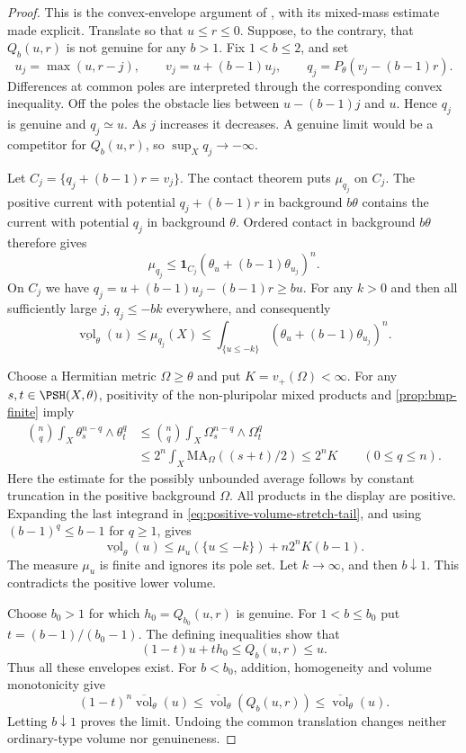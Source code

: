 \begin{proof}
This is the convex-envelope argument of \cite[Proposition 3.1]{XL26}, with its mixed-mass estimate made explicit. Translate so that $u\leq r\leq0$. Suppose, to the contrary, that $Q_b(u,r)$ is not genuine for any $b>1$. Fix $1<b\leq2$, and set
\[
 u_j=\max(u,r-j),\qquad v_j=u+(b-1)u_j,
 \qquad q_j=P_\theta(v_j-(b-1)r).
\]
Differences at common poles are interpreted through the corresponding convex inequality. Off the poles the obstacle lies between $u-(b-1)j$ and $u$. Hence $q_j$ is genuine and $q_j\simeq u$. As $j$ increases it decreases. A genuine limit would be a competitor for $Q_b(u,r)$, so $\sup_Xq_j\to-\infty$.

Let $C_j=\{q_j+(b-1)r=v_j\}$. The contact theorem puts $\mu_{q_j}$ on $C_j$. The positive current with potential $q_j+(b-1)r$ in background $b\theta$ contains the current with potential $q_j$ in background $\theta$. Ordered contact in background $b\theta$ therefore gives
\[
 \mu_{q_j}\leq\mathbf1_{C_j}(\theta_u+(b-1)\theta_{u_j})^n.
\]
On $C_j$ we have $q_j=u+(b-1)u_j-(b-1)r\geq bu$. For any $k>0$ and then all sufficiently large $j$, $q_j\leq-bk$ everywhere, and consequently
\begin{equation}\label{eq:positive-volume-stretch-tail}
 \underline{\operatorname{vol}}_\theta(u)
 \leq\mu_{q_j}(X)
 \leq\int_{\{u\leq-k\}}(\theta_u+(b-1)\theta_{u_j})^n.
\end{equation}

Choose a Hermitian metric $\Omega\geq\theta$ and put $K=v_+(\Omega)<\infty$. For any $s,t\in\PSH(X,\theta)$, positivity of the non-pluripolar mixed products and \cref{prop:bmp-finite} imply
\[
 \begin{split}
 \binom nq\int_X\theta_s^{n-q}\wedge\theta_t^q
 &\leq\binom nq\int_X\Omega_s^{n-q}\wedge\Omega_t^q\\
 &\leq2^n\int_X\mathrm{MA}_\Omega((s+t)/2)
 \leq2^nK\qquad(0\leq q\leq n).
 \end{split}
\]
Here the estimate for the possibly unbounded average follows by constant truncation in the positive background $\Omega$. All products in the display are positive. Expanding the last integrand in \eqref{eq:positive-volume-stretch-tail}, and using $(b-1)^q\leq b-1$ for $q\geq1$, gives
\[
 \underline{\operatorname{vol}}_\theta(u)
 \leq\mu_u(\{u\leq-k\})+n2^nK(b-1).
\]
The measure $\mu_u$ is finite and ignores its pole set. Let $k\to\infty$, and then $b\downarrow1$. This contradicts the positive lower volume.

Choose $b_0>1$ for which $h_0=Q_{b_0}(u,r)$ is genuine. For $1<b\leq b_0$ put $t=(b-1)/(b_0-1)$. The defining inequalities show that
\[
 (1-t)u+th_0\leq Q_b(u,r)\leq u.
\]
Thus all these envelopes exist. For $b<b_0$, addition, homogeneity and volume monotonicity give
\[
 (1-t)^n\overline{\operatorname{vol}}_\theta(u)
 \leq\overline{\operatorname{vol}}_\theta(Q_b(u,r))
 \leq\overline{\operatorname{vol}}_\theta(u).
\]
Letting $b\downarrow1$ proves the limit. Undoing the common translation changes neither ordinary-type volume nor genuineness.
\end{proof}

